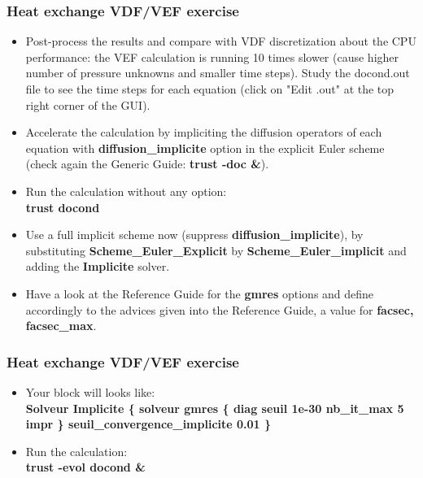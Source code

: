 \documentclass[10pt, hyperref={unicode=true,pdfusetitle, bookmarks=true,bookmarksnumbered=false,bookmarksopen=false, breaklinks=false,pdfborder={0 0 1},backref=true,colorlinks=true,linkcolor=darkblue,pageanchor}]{beamer}
\begin{document}
\begin{frame}
\frametitle{Heat exchange VDF/VEF exercise}
\begin{block}{}

\begin{itemize}
\item Post-process the results and compare with VDF discretization about the CPU performance: the VEF calculation is running 10 times slower (cause higher number of pressure unknowns and smaller time steps). Study the docond.out file to see the time steps for each equation (click on "Edit .out" at the top right corner of the GUI).

\item Accelerate the calculation by impliciting the diffusion operators of each equation with \textbf{diffusion\_implicite} option in the explicit Euler scheme (check again the Generic Guide: \textbf{trust -doc \&}). 

\item Run the calculation without any option: \\
\textbf{trust docond}

\item \label{schema_impl} Use a full implicit scheme now (suppress \textbf{diffusion\_implicite}), by substituting \textbf{Scheme\_Euler\_Explicit} by \textbf{Scheme\_Euler\_implicit} and adding the \textbf{Implicite} solver.

\item Have a look at the Reference Guide for the \textbf{gmres} options and define accordingly to the advices given into the Reference Guide, a value for \textbf{facsec, facsec\_max}.
\end{itemize}

\end{block}
\end{frame}
\begin{frame}
\frametitle{Heat exchange VDF/VEF exercise}
\begin{block}{}

\begin{itemize}
\item Your block will looks like:\\
\textbf{Solveur Implicite \{ solveur gmres \{ diag seuil 1e-30 nb\_it\_max 5 impr \}  seuil\_convergence\_implicite 0.01  \} }

\item Run the calculation:\\
\textbf{trust -evol docond  \&}
\end{itemize}

\end{block}
\end{frame}
\end{document}

